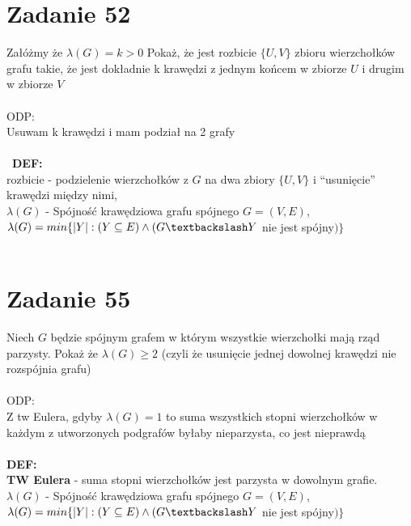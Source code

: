\documentclass{article}
\begin{document}
\section{\centering Zadanie 52}
Załóżmy że $\lambda(G) = k > 0$ Pokaż, że jest rozbicie $\{U,V\}$ zbioru wierzchołków grafu takie, że jest dokładnie k krawędzi z jednym końcem w zbiorze $U$ i drugim w zbiorze $V$\\\\
ODP: \\
Usuwam k krawędzi i mam podział na 2 grafy\\\\\
\noindent \textbf{DEF:} \\
rozbicie - podzielenie wierzchołków z $G$ na dwa zbiory $\{U,V\}$ i ``usunięcie'' krawędzi między nimi, \\
$\lambda(G)$ - Spójność krawędziowa grafu spójnego $G=(V,E)$, \\ 
\indent $\lambda(G) = min \{|Y|: (Y \subseteq E) \land (G\textbackslash Y$ nie jest spójny$)\}$\\\\
\section{\centering Zadanie 55}
Niech $G$ będzie spójnym grafem w którym wszystkie wierzchołki mają rząd parzysty. Pokaż że $\lambda(G) \geq 2$ (czyli że usunięcie jednej dowolnej krawędzi nie rozspójnia grafu)\\\\
ODP:\\
Z tw Eulera, gdyby $\lambda(G) = 1$ to suma wszystkich stopni wierzchołków w każdym z utworzonych podgrafów byłaby nieparzysta, co jest nieprawdą\\\\
\noindent \textbf{DEF:} \\
\textbf{TW Eulera} - suma stopni wierzchołków jest parzysta w dowolnym grafie.\\
$\lambda(G)$ - Spójność krawędziowa grafu spójnego $G=(V,E)$, \\ 
\indent $\lambda(G) = min \{|Y|: (Y \subseteq E) \land (G\textbackslash Y$ nie jest spójny$)\}$\\\\
\end{document}
